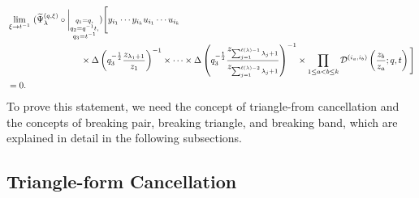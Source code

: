 \documentclass[12pt,reqno,a4paper]{amsart}
\newcommand{\comp}{\circ}
\newcommand{\cals}[1]{\mathcal{#1}}
\numberwithin{equation}{section}
\newcommand{\dualmap}{
\widetilde{\Psi}^{(q,\xi)}_{\lambda}
}
\theoremstyle{definition}
\begin{document}
\footnotesize
\begin{align}
	&\lim_{\xi \rightarrow t^{-1}}\,\,
	(
	\dualmap
	\comp 
	\bigg|_{
		\substack{
			q_1 = q, \\
			q_2 = q^{-1}t,\\
			q_3 = t^{-1} \\
		}
	}
	)
	\Bigg[
	y_{i_1}\cdots y_{i_k}
	u_{i_1}\cdots u_{i_k}
	\\
	&\hspace{2.9cm}\times
	\Delta\left(	q_3^{-\frac{1}{2}}\frac{z_{\lambda_1 + 1}}{z_1}				\right)^{-1}
	\times 
	\cdots 
	\times 
	\Delta\left(	q_3^{-\frac{1}{2}}\frac{z_{\sum_{j = 1}^{\ell(\lambda) - 1}\lambda_j+1}}{z_{\sum_{j = 1}^{\ell(\lambda) - 2}\lambda_j+1}}				\right)^{-1}
	\times
	\prod_{1 \leq a < b \leq k}
	\cals{D}^{(i_a,i_b)}\left(
	\frac{z_b}{z_a}
	; q, t
	\right)
	\Bigg]
	\notag
	\\
	&= 0. 
	\notag 
\end{align}
\normalsize 
To prove this statement, we need the concept of triangle-from cancellation and the concepts of breaking pair, breaking triangle, and breaking band, which are explained in detail in the following subsections. 


\subsection{Triangle-form Cancellation}
\end{document}
